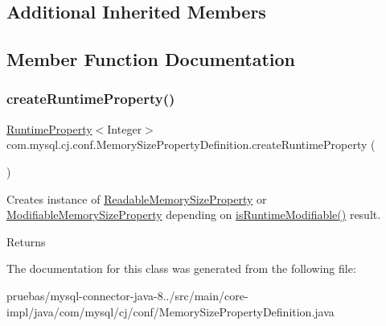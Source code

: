 \subsection*{Additional Inherited Members}


\subsection{Member Function Documentation}
\mbox{\label{classcom_1_1mysql_1_1cj_1_1conf_1_1_memory_size_property_definition_af5bd3b81a694d07152eb314e85a7015b}} 
\subsubsection{\texorpdfstring{create\+Runtime\+Property()}{createRuntimeProperty()}}
{\footnotesize\ttfamily \mbox{\hyperlink{interfacecom_1_1mysql_1_1cj_1_1conf_1_1_runtime_property}{Runtime\+Property}}$<$Integer$>$ com.\+mysql.\+cj.\+conf.\+Memory\+Size\+Property\+Definition.\+create\+Runtime\+Property (\begin{DoxyParamCaption}{ }\end{DoxyParamCaption})}

Creates instance of \mbox{\hyperlink{classcom_1_1mysql_1_1cj_1_1conf_1_1_readable_memory_size_property}{Readable\+Memory\+Size\+Property}} or \mbox{\hyperlink{classcom_1_1mysql_1_1cj_1_1conf_1_1_modifiable_memory_size_property}{Modifiable\+Memory\+Size\+Property}} depending on \mbox{\hyperlink{classcom_1_1mysql_1_1cj_1_1conf_1_1_abstract_property_definition_a6c98140b2db84ccd0ff29ce165ec9ef5}{is\+Runtime\+Modifiable()}} result.

\begin{DoxyReturn}{Returns}

\end{DoxyReturn}


The documentation for this class was generated from the following file\+:\begin{DoxyCompactItemize}
\item 
pruebas/mysql-\/connector-\/java-\/8../src/main/core-\/impl/java/com/mysql/cj/conf/Memory\+Size\+Property\+Definition.\+java\end{DoxyCompactItemize}
